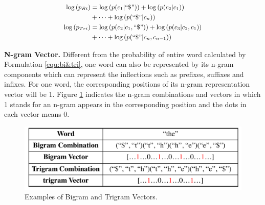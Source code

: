\begin{equation}
\small
\label{equ:bi&tri} 
\begin{split}
\log\left(p_{Bi}\right)&=\log\left(p(c_1|``\$")\right)+\log\left(p(c_2|c_1)\right)\\
&+\dots+
\log\left(p(``\$"|c_n)\right)\\
\log\left(p_{Tri}\right)&=\log\left(p(c_2|c_1,``\$")\right)+\log\left(p(c_3|c_2,c_1)\right)\\
&+\dots+\log\left(p(``\$"|c_n,c_{n-1})\right)
\end{split}
\end{equation}

\textbf{N-gram Vector.} 
Different from the probability of entire word calculated by Formulation \ref{equ:bi&tri}, one word can also be represented by its n-gram components which can represent the inflections such as prefixes, suffixes and infixes.
For one word, the corresponding positions of its n-gram representation vector will be 1.
Figure \ref{fig:bitri} indicates the n-gram combinations and vectors in which 1 stands for an n-gram appears in the corresponding position and the dots in each vector means 0.
\begin{figure}[th]
	\centering
	\scriptsize
	\includegraphics[width=1\linewidth]{pic/bitri.pdf}  
	\vspace{-0.45cm}
	\caption{Examples of Bigram and Trigram Vectors.}
	\label{fig:bitri}
\end{figure}
\vspace{-0.5cm}

